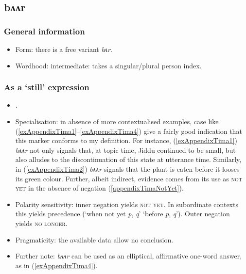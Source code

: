 \subsection{bʌʌr}
\subsubsection{General information}
\begin{itemize}
	\item Form: there is a free variant \textit{bʌr}.
	\item Wordhood: intermediate: takes a singular/plural person index.
\end{itemize}


\subsubsection{As a  \lq still\rq{ }expression}
\begin{itemize}
	\item \textcite{SchneiderBlum2013}.
	\item Specialisation: in absence of more contextualised examples, case like (\ref{exAppendixTima1}–\ref{exAppendixTima4}) give a fairly good indication that this marker conforms to my definition. For instance, (\ref{exAppendixTima1}) \mbox{\textit{bʌʌr}} not only signals that, at topic time,  Jiddu continued to be small, but also alludes to the discontinuation of this state at utterance time. Similarly, in (\ref{exAppendixTima2}) \mbox{\textit{bʌʌr}} signals that the plant is eaten before it looses its green colour. Further, albeit indirect, evidence comes from its use as \textsc{not yet} in the absence of negation (\ref{appendixTimaNotYet}).
	\item Polarity sensitivity: inner negation yields \textsc{not yet}. In subordinate contexts this yields precedence (\lq when not yet \textit{p}, \textit{q}\rq{} \equiv{ } \lq{}before \textit{p}, \textit{q}\rq{}). Outer negation yields \textsc{no longer}.
	\item Pragmaticity: the available data allow no conclusion.
	\item Further note: \textit{bʌʌr} can be used as an elliptical, affirmative one-word answer, as in (\ref{exAppendixTima4}).
\end{itemize}
